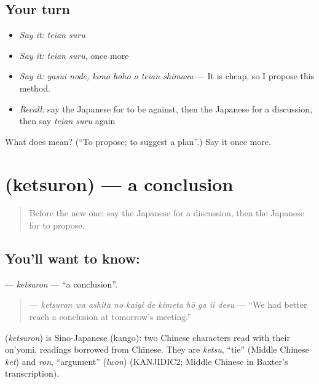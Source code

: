 \subsection*{Your turn}
\begin{itemize}
\raggedright
  \item \emph{Say it:} \emph{teian suru}
  \item \emph{Say it:} \emph{teian suru}, once more
  \item \emph{Say it:} \emph{yasui node, kono hōhō o teian shimasu} — It is cheap, so I propose this method.
  \item \emph{Recall:} say the Japanese for to be against, then the Japanese for a discussion, then say \emph{teian suru} again
\end{itemize}

\begin{tcolorbox}[breakable,colback=teal!4,colframe=teal!35!black,title={Before you move on}]
What does  mean? (\textquotedblleft{}To propose; to suggest a plan\textquotedblright{}.) Say it once more.
\end{tcolorbox}
\section[\texorpdfstring{\ja{けつろん} (ketsuron)}{けつろん (ketsuron)}]{ (ketsuron) — a conclusion}

\label{lesson:JA-C317-ketsuron}



\begin{quote}
Before the new one: say the Japanese for a discussion, then the Japanese for to propose.
\end{quote}

\subsection*{You'll want to know: }
\textbf{} — \emph{ketsuron} — \textquotedblleft{}a conclusion\textquotedblright{}.

\begin{quote}
\textbf{     } — \emph{ketsuron wa ashita no kaigi de kimeta hō ga ii desu} — \textquotedblleft{}We had better reach a conclusion at tomorrow's meeting.\textquotedblright{}
\end{quote}

\begin{cousinweb}
\textbf{} (\emph{ketsuron}) is Sino-Japanese (kango): two Chinese characters read with their on'yomi, readings borrowed from Chinese. They are \emph{ketsu}, \textquotedblleft{}tie\textquotedblright{} (Middle Chinese \emph{ket}) and \emph{ron}, \textquotedblleft{}argument\textquotedblright{} (\emph{lwon}) (KANJIDIC2; Middle Chinese in Baxter's transcription).
\end{cousinweb}

